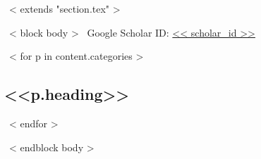 ~< extends "section.tex" >~

~< block body >~
\vspace{-7.5mm}
\hfill
Google Scholar ID:
\href{https://scholar.google.com/citations?user=<< scholar_id >>}{<< scholar_id >>}
\vspace{2mm}

\renewcommand*{\bibfont}{\small}

~< for p in content.categories >~
\subsection{<<p.heading>>}
\begin{refsection}
\nocite{*}
\printbibliography[heading=none,prefixnumbers=<<p.prefix>>]
\end{refsection}
~< endfor >~

~< endblock body >~
